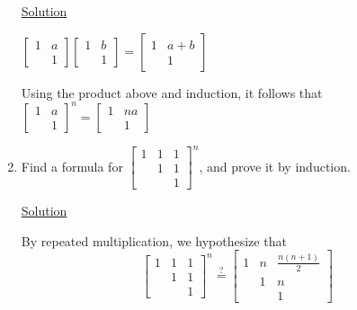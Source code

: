 \begin{enumerate}
\underline{Solution}

$\begin{bmatrix}
1 & a\\
  & 1
\end{bmatrix} \begin{bmatrix}
1 & b\\
  & 1
\end{bmatrix} = \begin{bmatrix}
1 & a+b\\
  & 1
\end{bmatrix}$

Using the product above and induction, it follows that
$\begin{bmatrix}
1 & a\\
  & 1
\end{bmatrix}^n = \begin{bmatrix}
1 & na\\
  & 1
\end{bmatrix}$

\item Find a formula for $\begin{bmatrix}
1 & 1 & 1\\
  & 1 & 1\\
  &   & 1    
\end{bmatrix}^n$, and prove it by induction.

\underline{Solution}

By repeated multiplication, we hypothesize that
\[\begin{bmatrix}
1 & 1 & 1\\
  & 1 & 1\\
  &   & 1    
\end{bmatrix}^n \stackrel{?}{=} \begin{bmatrix}
1 & n & \frac{n(n+1)}{2}\\
  & 1 & n\\
  &   & 1    
\end{bmatrix}\]


\end{enumerate}

